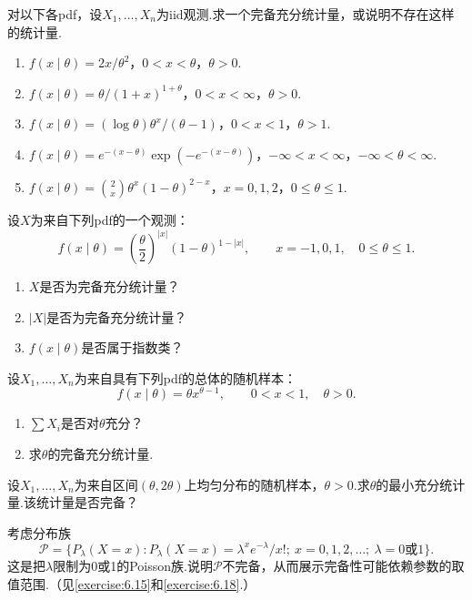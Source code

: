 \begin{exercise}\label{exercise:6.20}
对以下各pdf，设$X_1,\ldots,X_n$为iid观测.求一个完备充分统计量，或说明不存在这样的统计量.
\begin{enumerate}[label=(\alph*)]
\item $f(x\mid\theta)=2x/\theta^2$，$0<x<\theta$，$\theta>0$.
\item $f(x\mid\theta)=\theta/(1+x)^{1+\theta}$，$0<x<\infty$，$\theta>0$.
\item $f(x\mid\theta)=(\log\theta)\theta^x/(\theta-1)$，$0<x<1$，$\theta>1$.
\item $f(x\mid\theta)=e^{-(x-\theta)}\exp(-e^{-(x-\theta)})$，$-\infty<x<\infty$，$-\infty<\theta<\infty$.
\item $f(x\mid\theta)=\binom2x\theta^x(1-\theta)^{2-x}$，$x=0,1,2$，$0\le\theta\le1$.
\end{enumerate}
\end{exercise}
\begin{exercise}\label{exercise:6.21}
设$X$为来自下列pdf的一个观测：
$$f(x\mid\theta)=\left(\frac\theta2\right)^{|x|}(1-\theta)^{1-|x|},\qquad x=-1,0,1,\quad0\le\theta\le1.$$
\begin{enumerate}[label=(\alph*)]
\item $X$是否为完备充分统计量？
\item $|X|$是否为完备充分统计量？
\item $f(x\mid\theta)$是否属于指数类？
\end{enumerate}
\end{exercise}
\begin{exercise}\label{exercise:6.22}
设$X_1,\ldots,X_n$为来自具有下列pdf的总体的随机样本：
$$f(x\mid\theta)=\theta x^{\theta-1},\qquad0<x<1,\quad\theta>0.$$
\begin{enumerate}[label=(\alph*)]
\item $\sum X_i$是否对$\theta$充分？
\item 求$\theta$的完备充分统计量.
\end{enumerate}
\end{exercise}
\begin{exercise}\label{exercise:6.23}
设$X_1,\ldots,X_n$为来自区间$(\theta,2\theta)$上均匀分布的随机样本，$\theta>0$.求$\theta$的最小充分统计量.该统计量是否完备？
\end{exercise}
\begin{exercise}\label{exercise:6.24}
考虑分布族
$$\mathcal P=\{P_\lambda(X=x):P_\lambda(X=x)=\lambda^xe^{-\lambda}/x!;\ x=0,1,2,\ldots;\ \lambda=0\text{或}1\}.$$
这是把$\lambda$限制为0或1的Poisson族.说明$\mathcal P$不完备，从而展示完备性可能依赖参数的取值范围.（见\autoref{exercise:6.15}和\autoref{exercise:6.18}.）
\end{exercise}
